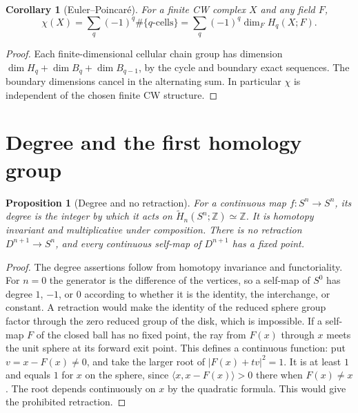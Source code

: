 \documentclass[11pt,oneside,openany]{book}
\theoremstyle{plain}
\newtheorem{proposition}[theorem]{Proposition}
\newtheorem{corollary}[theorem]{Corollary}
\theoremstyle{definition}
\theoremstyle{remark}
\begin{document}
\begin{corollary}[Euler--Poincar\'e]\label{cor:p202-euler}
For a finite CW complex \(X\) and any field \(F\),
\[
 \chi(X)=\sum_q(-1)^q \#\{\text{\(q\)-cells}\}
       =\sum_q(-1)^q\dim_F H_q(X;F).
\]
\end{corollary}
\begin{proof}
Each finite-dimensional cellular chain group has dimension
\(\dim H_q+\dim B_q+\dim B_{q-1}\), by the cycle and
boundary exact sequences. The boundary dimensions cancel
in the alternating sum. In particular \(\chi\) is independent
of the chosen finite CW structure.
\end{proof}

\section{Degree and the first homology group}\label{p202:T22}

\begin{proposition}[Degree and no retraction]\label{prop:p202-degree}
For a continuous map \(f:S^n\to S^n\), its degree is the integer
by which it acts on \(\widetilde H_n(S^n;\mathbb Z)\simeq\mathbb Z\).
It is homotopy invariant and multiplicative under composition.
There is no retraction \(D^{n+1}\to S^n\), and every continuous
self-map of \(D^{n+1}\) has a fixed point.
\end{proposition}
\begin{proof}
The degree assertions follow from homotopy invariance and
functoriality. For \(n=0\) the generator is the difference
of the vertices, so a self-map of \(S^0\) has degree \(1\),
\(-1\), or \(0\) according to whether it is the identity,
the interchange, or constant. A retraction would make the
identity of the reduced sphere group factor through the
zero reduced group of the disk, which is impossible. If
a self-map \(F\) of the closed ball has no fixed point,
the ray from \(F(x)\) through \(x\) meets the unit sphere at
its forward exit point. This defines a continuous function:
put \(v=x-F(x)\ne0\), and take the larger root of
\(\lvert F(x)+tv\rvert^2=1\). It is at least \(1\) and
equals \(1\) for \(x\) on the sphere, since
\(\langle x,x-F(x)\rangle>0\) there when \(F(x)\ne x\).
The root depends continuously on \(x\) by the quadratic
formula. This would give the prohibited retraction.
\end{proof}
\end{document}
